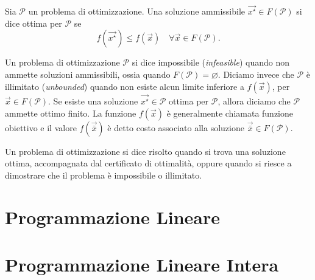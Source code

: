 \begin{definition}
Sia $\mathcal{P}$ un problema di ottimizzazione. Una soluzione ammissibile
$\vec{x^{\star}} \in F(\mathcal{P})$ si dice ottima per $\mathcal{P}$ se
\[
    f(\vec{x^{\star}}) \le f(\vec{x}) \quad \forall \vec{x} \in
    F(\mathcal{P}).
\]
\end{definition}
Un problema di ottimizzazione $\mathcal{P}$ si dice impossibile
(\textit{infeasible}) quando non ammette soluzioni ammissibili, ossia
quando $F(\mathcal{P}) = \varnothing$. Diciamo invece che $\mathcal{P}$ è
illimitato (\textit{unbounded}) quando non esiste alcun limite inferiore a
$f(\vec{x})$, per $\vec{x} \in F(\mathcal{P})$. Se esiste una soluzione
$\vec{x^{\star}} \in \mathcal{P}$ ottima per $\mathcal{P}$, allora diciamo
che $\mathcal{P}$ ammette ottimo finito. La funzione $f(\vec{x})$ è
generalmente chiamata funzione obiettivo e il valore $f(\vec{\bar{x}})$ è
detto costo associato alla soluzione $\vec{\bar{x}} \in F(\mathcal{P})$.

Un problema di ottimizzazione si dice risolto quando si trova una soluzione
ottima, accompagnata dal certificato di ottimalità, oppure quando si riesce
a dimostrare che il problema è impossibile o illimitato.

\section{Programmazione Lineare}
\section{Programmazione Lineare Intera}


